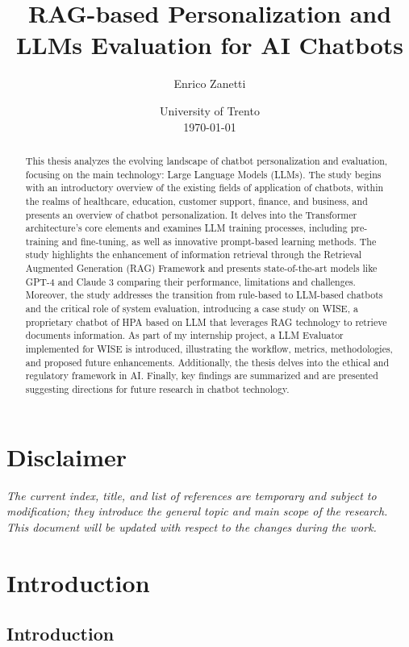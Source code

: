 \documentclass[12pt]{article}
\title{RAG-based Personalization and LLMs Evaluation for AI Chatbots}
\author{Enrico Zanetti}
\date{%
    University of Trento\\[2ex]%
    \today
}
\begin{document}
\maketitle

\begin{abstract}
This thesis analyzes the evolving landscape of chatbot personalization and evaluation, focusing on the main technology: Large Language Models (LLMs). The study begins with an introductory overview of the existing fields of application of chatbots, within the realms of healthcare, education, customer support, finance, and business, and presents an overview of chatbot personalization. It delves into the Transformer architecture’s core elements and examines LLM training processes, including pre-training and fine-tuning, as well as innovative prompt-based learning methods. The study highlights the enhancement of information retrieval through the Retrieval Augmented Generation (RAG) Framework and presents state-of-the-art models like GPT-4 and Claude 3 comparing their performance, limitations and challenges.
\newline
Moreover, the study addresses the transition from rule-based to LLM-based chatbots and the critical role of system evaluation, introducing a case study on WISE, a proprietary chatbot of HPA based on LLM that leverages RAG technology to retrieve documents information. As part of my internship project, a LLM Evaluator implemented for WISE is introduced, illustrating the workflow, metrics, methodologies, and proposed future enhancements. Additionally, the thesis delves into the ethical and regulatory framework in AI. Finally, key findings are summarized and are presented suggesting directions for future research in chatbot technology.
\end{abstract}

\section*{Disclaimer}
\textit{The current index, title, and list of references are temporary and subject to modification; they introduce the general topic and main scope of the research. This document will be updated with respect to the changes during the work.}

\tableofcontents
\newpage

\section{Introduction}
\subsection{Introduction}
\end{document}
